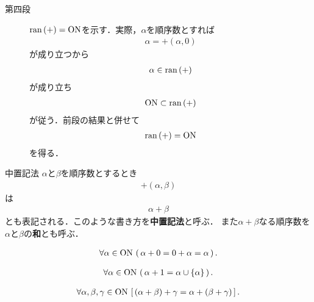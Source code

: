 \begin{sketch}
\begin{description}
			\item[第四段] $\operatorname*{ran} \left(+\right) = \mathrm{ON}$を示す．実際，$\alpha$を順序数とすれば
				\begin{align}
					\alpha = +(\alpha,0)
				\end{align}
				が成り立つから
				\begin{align}
					\alpha \in \operatorname*{ran} \left(+\right)
				\end{align}
				が成り立ち
				\begin{align}
					\mathrm{ON} \subset \operatorname*{ran} \left(+\right)
				\end{align}
				が従う．前段の結果と併せて
				\begin{align}
					\operatorname*{ran} \left(+\right) = \mathrm{ON}
				\end{align}
				を得る．
				\QED
		\end{description}
	\end{sketch}
	
	\begin{itembox}[l]{中置記法}
		$\alpha$と$\beta$を順序数とするとき
		\begin{align}
			+(\alpha,\beta)
		\end{align}
		は
		\begin{align}
			\alpha + \beta
		\end{align}
		とも表記される．このような書き方を{\bf 中置記法}と呼ぶ．
		また$\alpha + \beta$なる順序数を$\alpha$と$\beta$の{\bf 和}とも呼ぶ．
	\end{itembox}
	
	\begin{screen}
		\begin{thm}[$0$を左から足しても変わらない]
			\begin{align}
				\forall \alpha \in \mathrm{ON}\, \left(\, \alpha + 0 = 0 + \alpha = \alpha\, \right).
			\end{align}
		\end{thm}
	\end{screen}
	
	\begin{screen}
		\begin{thm}
			\begin{align}
				\forall \alpha \in \mathrm{ON}\, \left(\, \alpha + 1 = \alpha \cup \{\alpha\}\, \right).
			\end{align}
		\end{thm}
	\end{screen}
	
	\begin{screen}
		\begin{thm}[加法は結合的]
			\begin{align}
				\forall \alpha,\beta,\gamma \in \mathrm{ON}\, \left[\, (\alpha + \beta) + \gamma = \alpha + (\beta + \gamma)\, \right].
			\end{align}
		\end{thm}
	\end{screen}
	
